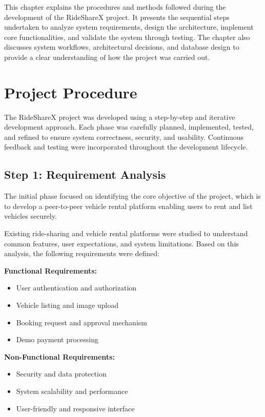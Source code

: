 \documentclass[12pt,a4paper]{report}
\begin{document}
This chapter explains the procedures and methods followed during the development of the RideShareX project. It presents the sequential steps undertaken to analyze system requirements, design the architecture, implement core functionalities, and validate the system through testing. The chapter also discusses system workflows, architectural decisions, and database design to provide a clear understanding of how the project was carried out.

\section{Project Procedure}

The RideShareX project was developed using a step-by-step and iterative development approach. Each phase was carefully planned, implemented, tested, and refined to ensure system correctness, security, and usability. Continuous feedback and testing were incorporated throughout the development lifecycle.

\subsection{Step 1: Requirement Analysis}

The initial phase focused on identifying the core objective of the project, which is to develop a peer-to-peer vehicle rental platform enabling users to rent and list vehicles securely.

Existing ride-sharing and vehicle rental platforms were studied to understand common features, user expectations, and system limitations. Based on this analysis, the following requirements were defined:

\textbf{Functional Requirements:}
\begin{itemize}
	\item User authentication and authorization
	\item Vehicle listing and image upload
	\item Booking request and approval mechanism
	\item Demo payment processing
\end{itemize}

\textbf{Non-Functional Requirements:}
\begin{itemize}
	\item Security and data protection
	\item System scalability and performance
	\item User-friendly and responsive interface
\end{itemize}
\end{document}
